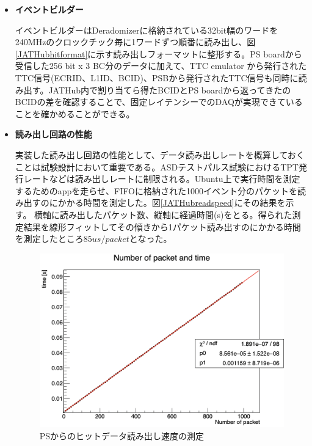\begin{itemize}
    \item \textbf{イベントビルダー} \par
    イベントビルダーはDeradomizerに格納されている32bit幅のワードを240MHzのクロックチック毎に1ワードずつ順番に読み出し、図\ref{JATHubhitformat}に示す読み出しフォーマットに整形する。PS boardから受信した256 bit x 3 BC分のデータに加えて、TTC emulator から発行されたTTC信号(ECRID、L1ID、BCID)、PSBから発行されたTTC信号も同時に読み出す。JATHub内で割り当てら得たBCIDとPS boardから返ってきたのBCIDの差を確認することで、固定レイテンシーでのDAQが実現できていることを確かめることができる。
    \baselineskip

    \item \textbf{読み出し回路の性能} \par
    実装した読み出し回路の性能として、データ読み出しレートを概算しておくことは試験設計において重要である。ASDテストパルス試験におけるTPT発行レートなどは読み出しレートに制限される。Ubuntu上で実行時間を測定するためのappを走らせ、FIFOに格納された1000イベント分のパケットを読み出すのにかかる時間を測定した。図\ref{JATHubreadspeed}にその結果を示す。
    横軸に読み出したパケット数、縦軸に経過時間(s)をとる。得られた測定結果を線形フィットしてその傾きから1パケット読み出すのにかかる時間を測定したところ$85 us/packet$となった。

    \baselineskip
    \begin{figure} 
    \centering
    \includegraphics[width=16cm]{fig/QAQC/JTAHubreadspeed.png}
    \caption[PSからのヒットデータ読み出し速度の測定]{PSからのヒットデータ読み出し速度の測定}
    \label{JTAHubreadspeed}
    \end{figure}


\end{itemize}
